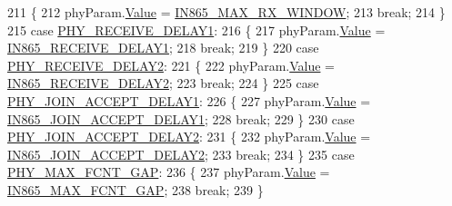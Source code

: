 \begin{DoxyCode}
211         \{
212             phyParam.\mbox{\hyperlink{unionu_phy_param_a8e0dcce3428a8051614e852b8836d0d1}{Value}} = \mbox{\hyperlink{group___r_e_g_i_o_n_i_n865_gaf29bf6c8c2906dc70b8b795b7168523e}{IN865\_MAX\_RX\_WINDOW}};
213             \textcolor{keywordflow}{break};
214         \}
215         \textcolor{keywordflow}{case} \mbox{\hyperlink{group___r_e_g_i_o_n_gga51cbe8f5433d914fe9cf81b451de2c2da3680d45f45e3e0a96ce9f1e1b5ed7371}{PHY\_RECEIVE\_DELAY1}}:
216         \{
217             phyParam.\mbox{\hyperlink{unionu_phy_param_a8e0dcce3428a8051614e852b8836d0d1}{Value}} = \mbox{\hyperlink{group___r_e_g_i_o_n_i_n865_ga7c1655393a8e012682387275d85f9db8}{IN865\_RECEIVE\_DELAY1}};
218             \textcolor{keywordflow}{break};
219         \}
220         \textcolor{keywordflow}{case} \mbox{\hyperlink{group___r_e_g_i_o_n_gga51cbe8f5433d914fe9cf81b451de2c2da9c7e3df5f55fab406960a9e5bf635155}{PHY\_RECEIVE\_DELAY2}}:
221         \{
222             phyParam.\mbox{\hyperlink{unionu_phy_param_a8e0dcce3428a8051614e852b8836d0d1}{Value}} = \mbox{\hyperlink{group___r_e_g_i_o_n_i_n865_ga466f7d5de82107e42f3ceb0a312cb833}{IN865\_RECEIVE\_DELAY2}};
223             \textcolor{keywordflow}{break};
224         \}
225         \textcolor{keywordflow}{case} \mbox{\hyperlink{group___r_e_g_i_o_n_gga51cbe8f5433d914fe9cf81b451de2c2daf564c82ebd72dcd6c4fc1e702b2ec64c}{PHY\_JOIN\_ACCEPT\_DELAY1}}:
226         \{
227             phyParam.\mbox{\hyperlink{unionu_phy_param_a8e0dcce3428a8051614e852b8836d0d1}{Value}} = \mbox{\hyperlink{group___r_e_g_i_o_n_i_n865_gaa1f6bf34fbc09d19267191ae009d9acc}{IN865\_JOIN\_ACCEPT\_DELAY1}};
228             \textcolor{keywordflow}{break};
229         \}
230         \textcolor{keywordflow}{case} \mbox{\hyperlink{group___r_e_g_i_o_n_gga51cbe8f5433d914fe9cf81b451de2c2da04e6c3d25ce44a74c0a29f28aa92eb48}{PHY\_JOIN\_ACCEPT\_DELAY2}}:
231         \{
232             phyParam.\mbox{\hyperlink{unionu_phy_param_a8e0dcce3428a8051614e852b8836d0d1}{Value}} = \mbox{\hyperlink{group___r_e_g_i_o_n_i_n865_gaa3078b10a852a328bf425e8b5d5969d1}{IN865\_JOIN\_ACCEPT\_DELAY2}};
233             \textcolor{keywordflow}{break};
234         \}
235         \textcolor{keywordflow}{case} \mbox{\hyperlink{group___r_e_g_i_o_n_gga51cbe8f5433d914fe9cf81b451de2c2da01c12b14686172b4a3c4d095deef4248}{PHY\_MAX\_FCNT\_GAP}}:
236         \{
237             phyParam.\mbox{\hyperlink{unionu_phy_param_a8e0dcce3428a8051614e852b8836d0d1}{Value}} = \mbox{\hyperlink{group___r_e_g_i_o_n_i_n865_ga8af1e01f501561a336d851c84dbd81b9}{IN865\_MAX\_FCNT\_GAP}};
238             \textcolor{keywordflow}{break};
239         \}

\end{DoxyCode}
